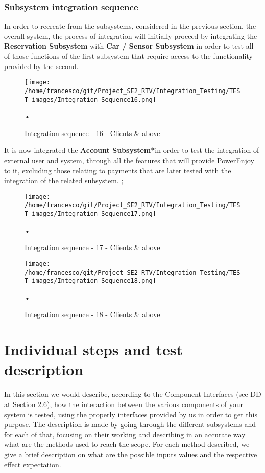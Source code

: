 \documentclass[10pt, a4paper,titlepage]{article}
\begin{document}
\subsubsection{Subsystem integration sequence}
In order to recreate from the subsystems, considered in the previous section, the overall system, the process of integration will initially proceed by integrating the \textbf{Reservation Subsystem} with \textbf{Car / Sensor Subsystem} in order to test all of those functions of the first subsystem that require access to the functionality provided by the second.
\begin{figure}[h]
\begin{center}
\texttt{[image: /home/francesco/git/Project\_SE2\_RTV/Integration\_Testing/TEST\_images/Integration\_Sequence16.png]}
\caption{Integration sequence - 16 - Clients \& above}
\label{fig:int_seq16}
\end{center}•
\end{figure}
It is now integrated  the \textbf{Account Subsystem*}in order to test the integration of external user and system, through all the features that will provide PowerEnjoy to it, excluding those relating to payments that are later tested with the integration of the related subsystem.
\pagebreak;
\begin{figure}[h]
\begin{center}
\texttt{[image: /home/francesco/git/Project\_SE2\_RTV/Integration\_Testing/TEST\_images/Integration\_Sequence17.png]}
\caption{Integration sequence - 17 - Clients \& above}
\label{fig:int_seq17}
\end{center}•
\end{figure}
\begin{figure}[h]
\begin{center}
\texttt{[image: /home/francesco/git/Project\_SE2\_RTV/Integration\_Testing/TEST\_images/Integration\_Sequence18.png]}
\caption{Integration sequence - 18 - Clients \& above}
\label{fig:int_seq18}
\end{center}•
\end{figure}
\clearpage
\section{Individual steps and test description} \label{sec3}
In this section we would describe, according to the Component Interfaces (see DD at Section 2.6), how the interaction between the various components of your system is tested, using the properly interfaces provided by us in order to get this purpose. The description is made by going through the different subsystems and for each of that, focusing on their working and describing in an accurate way what are the methods used to reach the scope. For each method described, we give a brief description on what are the possible inputs values and the respective effect expectation.
\end{document}
